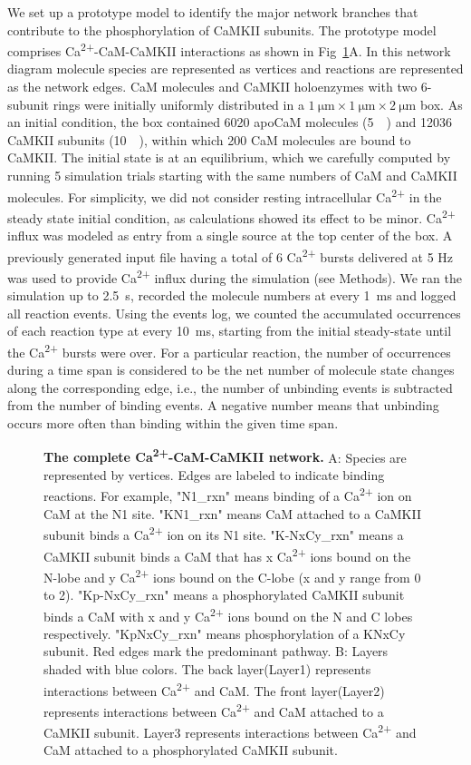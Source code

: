 \documentclass[10pt,letterpaper]{article}
\begin{document}
We set up a prototype model to identify the major network branches that contribute to the phosphorylation of CaMKII subunits. The prototype model comprises Ca\textsuperscript{2+}-CaM-CaMKII interactions as shown in Fig~\ref{fig3}A. In this network diagram molecule species are represented as vertices and reactions are represented as the network edges. CaM molecules and CaMKII holoenzymes with two 6-subunit rings were initially uniformly distributed in a $\SI{1}{\um}\times\SI{1}{\um}\times\SI{2}{\um}$ box. As an initial condition, the box contained 6020 apoCaM molecules (\SI{5}{\micro\Molar}) and 12036 CaMKII subunits (\SI{10}{\micro\Molar}), within which 200 CaM molecules are bound to CaMKII. The initial state is at an equilibrium, which we carefully computed by running 5 simulation trials starting with the same numbers of CaM and CaMKII molecules. For simplicity, we did not consider resting intracellular Ca\textsuperscript{2+} in the steady state initial condition, as calculations showed its effect to be minor. Ca\textsuperscript{2+} influx was modeled as entry from a single source at the top center of the box. A previously generated input file having a total of 6 Ca\textsuperscript{2+} bursts delivered at 5 Hz was used to provide Ca\textsuperscript{2+} influx during the simulation (see Methods). We ran the simulation up to \SI{2.5}{\s}, recorded the molecule numbers at every \SI{1}{\ms} and logged all reaction events. Using the events log, we counted the accumulated occurrences of each reaction type at every \SI{10}{\ms}, starting from the initial steady-state until the Ca\textsuperscript{2+} bursts were over. For a particular reaction, the number of occurrences during a time span is considered to be the net number of molecule state changes along the corresponding edge, i.e., the number of unbinding events is subtracted from the number of binding events. A negative number means that unbinding occurs more often than binding within the given time span. 

\begin{figure}[!h]
	\caption{{\bf The complete Ca\textsuperscript{2+}-CaM-CaMKII network.}
	A: Species are represented by vertices. Edges are labeled to indicate binding reactions. For example, "N1\_rxn" means binding of a Ca\textsuperscript{2+} ion on CaM at the N1 site. "KN1\_rxn" means CaM attached to a CaMKII subunit binds a Ca\textsuperscript{2+} ion on its N1 site. "K-NxCy\_rxn" means a CaMKII subunit binds a CaM that has x Ca\textsuperscript{2+} ions bound on the N-lobe and y Ca\textsuperscript{2+} ions bound on the C-lobe (x and y range from 0 to 2). "Kp-NxCy\_rxn" means a phosphorylated CaMKII subunit binds a CaM with x and y Ca\textsuperscript{2+} ions bound on the N and C lobes respectively. "KpNxCy\_rxn" means phosphorylation of a KNxCy subunit. Red edges mark the predominant pathway. B: Layers shaded with blue colors. The back layer(Layer1) represents interactions between Ca\textsuperscript{2+} and CaM. The front layer(Layer2) represents interactions between Ca\textsuperscript{2+} and CaM attached to a CaMKII subunit. Layer3 represents interactions between Ca\textsuperscript{2+} and CaM attached to a phosphorylated CaMKII subunit.
	}
\label{fig3}
\end{figure}
\end{document}
